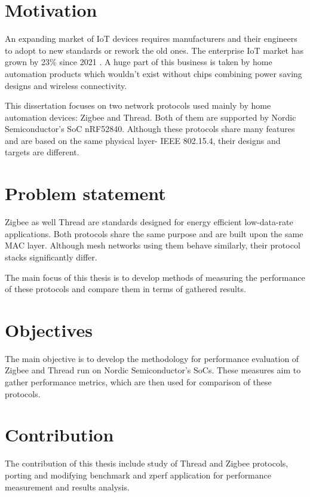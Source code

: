 
\section{Motivation}

An expanding market of IoT devices requires manufacturers and their engineers to adopt to new standards or rework 
the old ones. The enterprise IoT market has grown by 23\% since 2021 \cite{IoTMarketSize}. A huge part of this business is taken
by home automation products which wouldn't exist without chips combining power saving designs and wireless connectivity.

This dissertation focuses on two network protocols used mainly by home automation devices: Zigbee and Thread.
Both of them are supported by Nordic Semiconductor's SoC nRF52840. Although these protocols share many features
and are based on the same physical layer- IEEE 802.15.4, their designs and targets are different.

\section{Problem statement}

Zigbee as well Thread are standards designed for energy efficient low-data-rate applications. Both protocols share the same purpose and are 
built upon the same MAC layer. Although mesh networks using them behave 
similarly, their protocol stacks significantly differ.

The main focus of this thesis is to develop methods of measuring the
performance of these protocols and compare them in terms of gathered results.

\section{Objectives}

The main objective is to develop the methodology for performance evaluation 
of Zigbee and Thread run on Nordic Semiconductor's SoCs. These measures
aim to gather performance metrics, which are then used for comparison 
of these protocols.

\section{Contribution}

The contribution of this thesis include study of Thread and Zigbee 
protocols, porting and modifying benchmark and zperf application for
performance measurement and results analysis.
